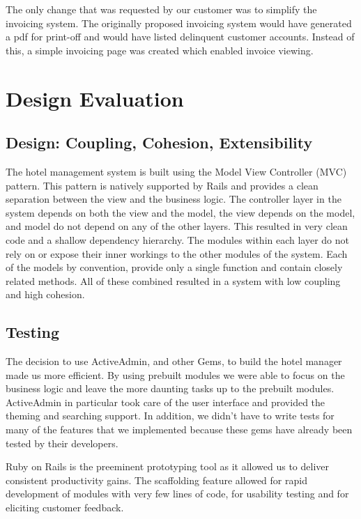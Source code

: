 \documentclass[12pt]{elsarticle}
\begin{document}
The only change that was requested by our customer was to simplify the invoicing system. The originally proposed invoicing system would have generated a pdf for print-off and would have listed delinquent customer accounts. Instead of this, a simple invoicing page was created which enabled invoice viewing.

\section{Design Evaluation}

\subsection{Design: Coupling, Cohesion, Extensibility}

The hotel management system is built using the Model View Controller (MVC) pattern. This pattern is natively supported by Rails and provides a clean separation between the view and the business logic. The controller layer in the system depends on both the view and the model, the view depends on the model, and model do not depend on any of the other layers. This resulted in very clean code and a shallow dependency hierarchy. The modules within each layer do not rely on or expose their inner workings to the other modules of the system. Each of the models by convention, provide only a single function and contain closely related methods. All of these combined resulted in a system with low coupling and high cohesion.

\subsection{Testing}

The decision to use ActiveAdmin, and other Gems, to build the hotel manager made us more efficient. By using prebuilt modules we were able to focus on the business logic and leave the more daunting tasks up to the prebuilt modules. ActiveAdmin in particular took care of the user interface and provided the theming and searching support. In addition, we didn't have to write tests for many of the features that we implemented because these gems have already been tested by their developers.

Ruby on Rails is the preeminent prototyping tool as it allowed us to deliver consistent productivity gains. The scaffolding feature allowed for rapid development of modules with very few lines of code, for usability testing and for eliciting customer feedback.
\end{document}
